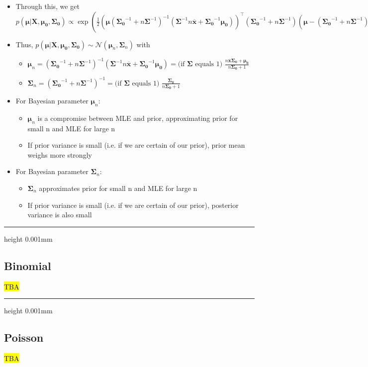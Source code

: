 \begin{itemize}
    \item Through this, we get $p(\boldsymbol{\mu} | \boldsymbol{X}, \boldsymbol{\mu_0}, \boldsymbol{\Sigma_0}) \propto \exp (  \frac{1}{2}  ( \boldsymbol{\mu} (  \boldsymbol{\Sigma_0}^{-1} + n \boldsymbol{\Sigma}^{-1} )^{-1} ( \boldsymbol{\Sigma}^{-1} n \overline{\boldsymbol{x}} + \boldsymbol{\Sigma_0}^{-1} \boldsymbol{\mu_0} ) )^\intercal ( \boldsymbol{\Sigma_0}^{-1} + n \boldsymbol{\Sigma}^{-1} ) ( \boldsymbol{\mu} - ( \boldsymbol{\Sigma_0}^{-1} + n \boldsymbol{\Sigma}^{-1} )^{-1} ( \boldsymbol{\Sigma}^{-1} n \overline{\boldsymbol{x}} + \boldsymbol{\Sigma_0}^{-1} \boldsymbol{\mu_0} ) ) ) = exp( \frac{1}{2} ( \boldsymbol{\mu} - \boldsymbol{\mu}_n )^\intercal  \boldsymbol{\Sigma}_n^{-1} ( \boldsymbol{\mu} - \boldsymbol{\mu}_n ) )$
    \item Thus, $p(\boldsymbol{\mu} | \boldsymbol{X}, \boldsymbol{\mu_0}, \boldsymbol{\Sigma_0}) \sim \mathcal{N}(\boldsymbol{\mu}_n, \boldsymbol{\Sigma}_n)$ with
    \begin{itemize}
        \item $\boldsymbol{\mu}_n = (\boldsymbol{\Sigma_0}^{-1} + n \boldsymbol{\Sigma}^{-1})^{-1} (\boldsymbol{\Sigma}^{-1} n \overline{\boldsymbol{x}} + \boldsymbol{\Sigma_0}^{-1} \boldsymbol{\mu_0}) = \textrm{(if } \boldsymbol{\Sigma} \textrm{ equals 1) } \frac{n \overline{\boldsymbol{x}} \boldsymbol{\Sigma_0} + \boldsymbol{\mu_0}}{n \boldsymbol{\Sigma_0} + 1}$
        \item $\boldsymbol{\Sigma}_n = (\boldsymbol{\Sigma_0}^{-1} + n \boldsymbol{\Sigma}^{-1})^{-1} = \textrm{(if } \boldsymbol{\Sigma} \textrm{ equals 1) } \frac{\boldsymbol{\Sigma_0}}{n \boldsymbol{\Sigma_0} + 1}$
    \end{itemize}
    \item For Bayesian parameter $\boldsymbol{\mu}_n$: \begin{itemize}
        \item $\boldsymbol{\mu}_n$ is a compromise between MLE and prior, approximating prior for small n and MLE for large n
        \item If prior variance is small (i.e. if we are certain of our prior), prior mean weighs more strongly
    \end{itemize}
    \item For Bayesian parameter $\boldsymbol{\Sigma}_n$: \begin{itemize}
        \item $\boldsymbol{\Sigma}_n$ approximates prior for small n and MLE for large n
        \item If prior variance is small (i.e. if we are certain of our prior), posterior variance is also small
    \end{itemize}
\end{itemize}

{\color{black}\hrule height 0.001mm}

\subsection*{Binomial}
\hl{TBA}

{\color{black}\hrule height 0.001mm}

\subsection*{Poisson}
\hl{TBA}

